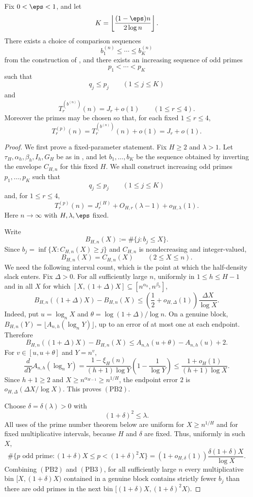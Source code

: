 \begin{theorem}\label{thm:prime-bridge}
Fix $0<\eps<1$, and let
\[
  K=\left\lfloor \frac{(1-\eps)n}{2\log n}\right\rfloor.
\]
There exists a choice of comparison sequences
\[
  b_1^{(n)}\le \cdots \le b_K^{(n)}
\]
from the construction of , and there exists an
increasing sequence of odd primes
\[
  p_1<\cdots<p_K
\]
such that
\[
  q_j \le p_j \qquad (1\le j\le K)
\]
and
\[
  T_r^{(b^{(n)})}(n)=J_r+o(1)
  \qquad (1\le r\le 4).
\]
Moreover the primes may be chosen so that, for each fixed $1\le r\le 4$,
\[
  T_r^{(p)}(n)=T_r^{(b^{(n)})}(n)+o(1)=J_r+o(1).
\]
\end{theorem}

\begin{proof}
We first prove a fixed-parameter statement.  Fix $H\ge2$ and
$\lambda>1$.  Let $\tau_H,\alpha_h,\beta_h,I_h,G_H$ be as in
, and let $b_1,\dots,b_K$ be the sequence
obtained by inverting the envelope $C_{H,n}$ for this fixed $H$.  We shall
construct increasing odd primes $p_1,\dots,p_K$ such that
\[
  q_j\le p_j \qquad (1\le j\le K)
\]
and, for $1\le r\le4$,
\[
  T_r^{(p)}(n)=J_r^{(H)}+O_{H,r}(\lambda-1)+o_{H,\lambda}(1).
  \tag{PB1}
\]
Here $n\to\infty$ with $H,\lambda,\eps$ fixed.

Write
\[
  B_{H,n}(X):=\#\{j:b_j\le X\}.
\]
Since $b_j=\inf\{X:C_{H,n}(X)\ge j\}$ and $C_{H,n}$ is nondecreasing and
integer-valued,
\[
  B_{H,n}(X)=C_{H,n}(X)
  \qquad (2\le X\le n).
\]
We need the following interval count, which is the point at which the
half-density slack enters.  Fix $\Delta>0$.  For all sufficiently large $n$,
uniformly in $1\le h\le H-1$ and in all $X$ for which
$[X,(1+\Delta)X]\subseteq[n^{\alpha_h},n^{\beta_h}]$,
\[
  B_{H,n}((1+\Delta)X)-B_{H,n}(X)
  \le
  \left(\frac12+o_{H,\Delta}(1)\right)\frac{\Delta X}{\log X}.
  \tag{PB2}
\]
Indeed, put $u=\log_n X$ and
$\theta=\log(1+\Delta)/\log n$.  On a genuine block,
$B_{H,n}(Y)=\lfloor A_{n,h}(\log_n Y)\rfloor$, up to an error of at most one
at each endpoint.  Therefore
\[
  B_{H,n}((1+\Delta)X)-B_{H,n}(X)
  \le
  A_{n,h}(u+\theta)-A_{n,h}(u)+2.
\]
For $v\in[u,u+\theta]$ and $Y=n^v$,
\[
  \frac{d}{dY}A_{n,h}(\log_n Y)
  =
  \frac{1-\xi_H(n)}{(h+1)\log Y}
  \left(1-\frac{1}{\log Y}\right)
  \le
  \frac{1+o_H(1)}{(h+1)\log X}.
\]
Since $h+1\ge2$ and $X\ge n^{\alpha_{H-1}}\ge n^{1/H}$, the endpoint error
$2$ is $o_{H,\Delta}(\Delta X/\log X)$.  This proves \((\mathrm{PB2})\).

Choose $\delta=\delta(\lambda)>0$ with
\[
  (1+\delta)^2\le\lambda.
\]
All uses of the prime number theorem below are uniform for
$X\ge n^{1/H}$ and for fixed multiplicative intervals, because $H$ and
$\delta$ are fixed.  Thus, uniformly in such $X$,
\[
  \#\{p\text{ odd prime}:(1+\delta)X\le p<(1+\delta)^2X\}
  =
  (1+o_{H,\delta}(1))\frac{\delta(1+\delta)X}{\log X}.
  \tag{PB3}
\]
Combining \((\mathrm{PB2})\) and \((\mathrm{PB3})\), for all sufficiently large $n$ every
multiplicative bin $[X,(1+\delta)X)$ contained in a genuine block contains
strictly fewer $b_j$ than there are odd primes in the next bin
$[(1+\delta)X,(1+\delta)^2X)$.


\end{proof}
